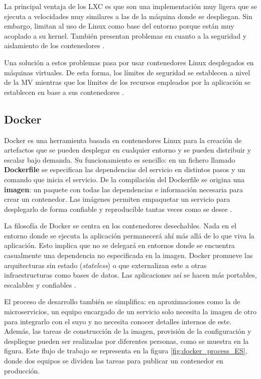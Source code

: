 \documentclass[11pt,spanish,listoffigures]{tfgetsinf}
\begin{document}
La principal ventaja de los LXC es que son una implementación muy ligera que se ejecuta a velocidades muy similares a las de la máquina donde se despliegan. Sin embargo, limitan al uso de Linux como base del entorno porque están muy acoplado a su kernel. También presentan problemas en cuanto a la seguridad y aislamiento de los contenedores \cite{Dua2014}. 

Una solución a estos problemas pasa por usar contenedores Linux desplegados en máquinas virtuales. De esta forma, los límites de seguridad se establecen a nivel de la MV mientras que los límites de los recursos empleados por la aplicación se establecen en base a sus contenedores \cite{DeAlfonso2017}.

\subsection{Docker}

Docker \cite{Matthias} es una herramienta basada en contenedores Linux para la creación de artefactos que se pueden desplegar en cualquier entorno y se pueden distribuir y escalar bajo demanda. Su funcionamiento es sencillo: en un fichero llamado \textbf{Dockerfile} se especifican las dependencias del servicio en distintos pasos y un comando que inicia el servicio. De la compilación del Dockerfile se origina una \textbf{imagen}: un paquete con todas las dependencias e información necesaria para crear un contenedor. Las imágenes permiten empaquetar un servicio para desplegarlo de forma confiable y reproducible tantas veces como se desee \cite{DelaTorre2018}.

La filosofía de Docker se centra en los contenedores desechables. Nada en el entorno donde se ejecuta la aplicación permanecerá ahí más allá de lo que viva la aplicación. Esto implica que no se delegará en entornos donde se encuentra casualmente una dependencia no especificada en la imagen. Docker promueve las arquitecturas sin estado (\textit{stateless}) o que externalizan este a otras infraestructuras como bases de datos. Las aplicaciones así se hacen más portables, escalables y confiables \cite{Matthias}.

El proceso de desarrollo también se simplifica: en aproximaciones como la de microservicios, un equipo encargado de un servicio solo necesita la imagen de otro para integrarlo con el suyo y no necesita conocer detalles internos de este. Además, las tareas de construcción de la imagen, provisión de la configuración y despliegue pueden ser realizadas por diferentes personas, como se muestra en la figura. Este flujo de trabajo se representa en la figura \ref{fig:docker_process_ES}, donde dos equipos se dividen las tareas para publicar un contenedor en producción. 
\end{document}
